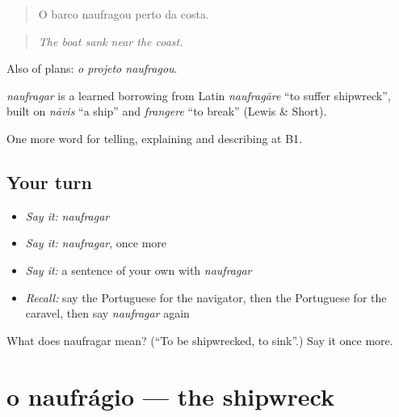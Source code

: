 \begin{quote}
O barco naufragou perto da costa.
\end{quote}

\begin{quote}
\emph{The boat sank near the coast.}
\end{quote}

Also of plans: \emph{o projeto naufragou}.

\begin{cousinweb}
\emph{naufragar} is a learned borrowing from Latin \emph{naufragāre} \textquotedblleft{}to suffer shipwreck\textquotedblright{}, built on \emph{nāvis} \textquotedblleft{}a ship\textquotedblright{} and \emph{frangere} \textquotedblleft{}to break\textquotedblright{} (Lewis \& Short).
\end{cousinweb}

\begin{grammarlens}[title={What you've built}]
One more word for telling, explaining and describing at B1.
\end{grammarlens}

\subsection*{Your turn}
\begin{itemize}
\raggedright
  \item \emph{Say it:} \emph{naufragar}
  \item \emph{Say it:} \emph{naufragar}, once more
  \item \emph{Say it:} a sentence of your own with \emph{naufragar}
  \item \emph{Recall:} say the Portuguese for the navigator, then the Portuguese for the caravel, then say \emph{naufragar} again
\end{itemize}

\begin{tcolorbox}[breakable,colback=teal!4,colframe=teal!35!black,title={Before you move on}]
What does naufragar mean? (\textquotedblleft{}To be shipwrecked, to sink\textquotedblright{}.) Say it once more.
\end{tcolorbox}
\section[o naufrágio]{o naufrágio — the shipwreck}

\label{lesson:PT-C328-naufragio}



